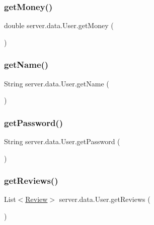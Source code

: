 \subsubsection{\texorpdfstring{get\+Money()}{getMoney()}}
{\footnotesize\ttfamily double server.\+data.\+User.\+get\+Money (\begin{DoxyParamCaption}{ }\end{DoxyParamCaption})}

\mbox{\label{classserver_1_1data_1_1_user_ab93c00a3d4afed35078368042d22dcbf}} 
\subsubsection{\texorpdfstring{get\+Name()}{getName()}}
{\footnotesize\ttfamily String server.\+data.\+User.\+get\+Name (\begin{DoxyParamCaption}{ }\end{DoxyParamCaption})}

\mbox{\label{classserver_1_1data_1_1_user_af36fc893e682a1b8f79f1e092e7f8057}} 
\subsubsection{\texorpdfstring{get\+Password()}{getPassword()}}
{\footnotesize\ttfamily String server.\+data.\+User.\+get\+Password (\begin{DoxyParamCaption}{ }\end{DoxyParamCaption})}

\mbox{\label{classserver_1_1data_1_1_user_aeb59521ec4dddcd7cc91a44ae01e660f}} 
\subsubsection{\texorpdfstring{get\+Reviews()}{getReviews()}}
{\footnotesize\ttfamily List$<$\hyperlink{classserver_1_1data_1_1_review}{Review}$>$ server.\+data.\+User.\+get\+Reviews (\begin{DoxyParamCaption}{ }\end{DoxyParamCaption})}

